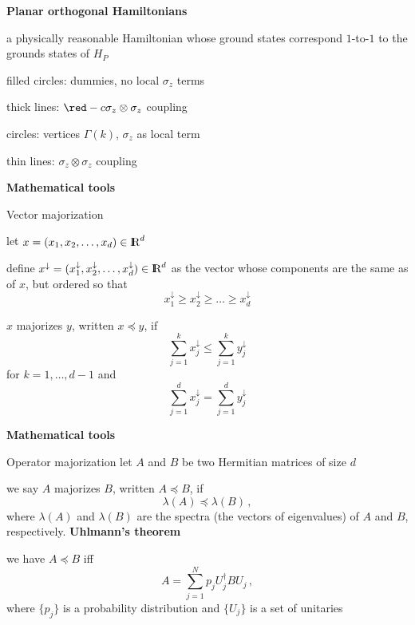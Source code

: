 \documentclass[portrait]{seminar}
\begin{document}
\begin{slide}
{\bf Planar orthogonal Hamiltonians}

a physically reasonable Hamiltonian whose ground states
correspond $1$-to-$1$ to the grounds states of $H_P$

\centerline{
}
\bigskip

\bigskip

\bigskip

\bigskip
filled circles: dummies, no local $\sigma_z$ terms

thick lines: ${\red -c}\sigma_z\otimes\sigma_z$ coupling

circles: vertices $\Gamma(k)$, $\sigma_z$ as local term

thin lines: $\sigma_z\otimes\sigma_z$ coupling
\end{slide}



\begin{slide}
{\bf Mathematical tools}

{\blue Vector majorization}

let $x=(x_1,x_2,\ldots,x_d)\in\R^d$

define
$x^\downarrow=(x^\downarrow_1,x^\downarrow_2,\ldots,x^\downarrow_d)\in\R^d$
as the vector whose components are the same as of $x$, but ordered so that
\[
x^\downarrow_1\ge x^\downarrow_2\ge\ldots\ge x^\downarrow_d
\]

{\blue $x$ majorizes $y$}, written {\blue $x\preceq y$}, if
\[
\sum_{j=1}^k x^\downarrow_j \le \sum_{j=1}^k y^\downarrow_j
\]
for $k=1,\ldots,d-1$ and 
\[
\sum_{j=1}^d x^\downarrow_j = \sum_{j=1}^d y^\downarrow_j
\]
\end{slide}

\begin{slide}
{\bf Mathematical tools} 

{\blue Operator majorization}
\vfill
let $A$ and $B$ be two Hermitian matrices of size $d$

we say {\blue $A$ majorizes $B$}, written {\blue $A\preceq B$}, if
\[
\lambda(A)\preceq\lambda(B)\,,
\]
where $\lambda(A)$ and $\lambda(B)$ are the spectra (the vectors of
eigenvalues) of $A$ and $B$, respectively.
\vfill
{\bf Uhlmann's theorem} 

we have $A\preceq B$ iff
\[
A=\sum_{j=1}^N p_j U_j^\dagger B U_j\,,
\]
where $\{p_j\}$ is a probability distribution and $\{U_j\}$ is a set
of unitaries
\vfill
\end{slide}
\end{document}
